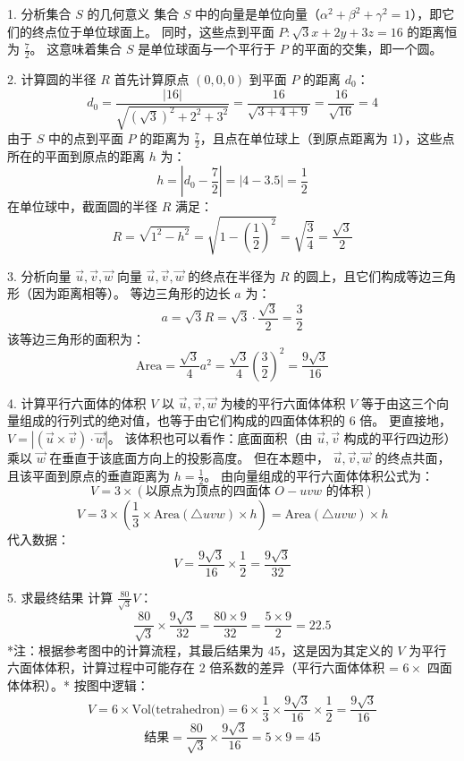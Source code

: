 \begin{questions}
\begin{solution}
 1. 分析集合 $S$ 的几何意义
集合 $S$ 中的向量是单位向量（$\alpha^2 + \beta^2 + \gamma^2 = 1$），即它们的终点位于单位球面上。
同时，这些点到平面 $P: \sqrt{3}x + 2y + 3z = 16$ 的距离恒为 $\frac{7}{2}$。
这意味着集合 $S$ 是单位球面与一个平行于 $P$ 的平面的交集，即一个圆。

 2. 计算圆的半径 $R$
首先计算原点 $(0,0,0)$ 到平面 $P$ 的距离 $d_0$：
\[ d_0 = \frac{|16|}{\sqrt{(\sqrt{3})^2 + 2^2 + 3^2}} = \frac{16}{\sqrt{3+4+9}} = \frac{16}{\sqrt{16}} = 4 \]
由于 $S$ 中的点到平面 $P$ 的距离为 $\frac{7}{2}$，且点在单位球上（到原点距离为 1），这些点所在的平面到原点的距离 $h$ 为：
\[ h = |d_0 - \frac{7}{2}| = |4 - 3.5| = \frac{1}{2} \]
在单位球中，截面圆的半径 $R$ 满足：
\[ R = \sqrt{1^2 - h^2} = \sqrt{1 - (\frac{1}{2})^2} = \sqrt{\frac{3}{4}} = \frac{\sqrt{3}}{2} \]

3. 分析向量 $\vec{u}, \vec{v}, \vec{w}$
向量 $\vec{u}, \vec{v}, \vec{w}$ 的终点在半径为 $R$ 的圆上，且它们构成等边三角形（因为距离相等）。
等边三角形的边长 $a$ 为：
\[ a = \sqrt{3}R = \sqrt{3} \cdot \frac{\sqrt{3}}{2} = \frac{3}{2} \]
该等边三角形的面积为：
\[ \text{Area} = \frac{\sqrt{3}}{4} a^2 = \frac{\sqrt{3}}{4} \left(\frac{3}{2}\right)^2 = \frac{9\sqrt{3}}{16} \]

4. 计算平行六面体的体积 $V$
以 $\vec{u}, \vec{v}, \vec{w}$ 为棱的平行六面体体积 $V$ 等于由这三个向量组成的行列式的绝对值，也等于由它们构成的四面体体积的 6 倍。
更直接地， $V = |(\vec{u} \times \vec{v}) \cdot \vec{w}|$。
该体积也可以看作：底面面积（由 $\vec{u}, \vec{v}$ 构成的平行四边形）乘以 $\vec{w}$ 在垂直于该底面方向上的投影高度。
但在本题中， $\vec{u}, \vec{v}, \vec{w}$ 的终点共面，且该平面到原点的垂直距离为 $h = \frac{1}{2}$。
由向量组成的平行六面体体积公式为：
\[ V = 3 \times (\text{以原点为顶点的四面体 } O-uvw \text{ 的体积}) \]
\[ V = 3 \times \left( \frac{1}{3} \times \text{Area}(\triangle uvw) \times h \right) = \text{Area}(\triangle uvw) \times h \]
代入数据：
\[ V = \frac{9\sqrt{3}}{16} \times \frac{1}{2} = \frac{9\sqrt{3}}{32} \]

 5. 求最终结果
计算 $\frac{80}{\sqrt{3}}V$：
\[ \frac{80}{\sqrt{3}} \times \frac{9\sqrt{3}}{32} = \frac{80 \times 9}{32} = \frac{5 \times 9}{2} = 22.5 \]
*注：根据参考图中的计算流程，其最后结果为 45，这是因为其定义的 $V$ 为平行六面体体积，计算过程中可能存在 2 倍系数的差异（平行六面体体积 = $6 \times$ 四面体体积）。*
按图中逻辑：
\[ V = 6 \times \text{Vol(tetrahedron)} = 6 \times \frac{1}{3} \times \frac{9\sqrt{3}}{16} \times \frac{1}{2} = \frac{9\sqrt{3}}{16} \]
\[ \text{结果} = \frac{80}{\sqrt{3}} \times \frac{9\sqrt{3}}{16} = 5 \times 9 = 45 \]
\end{solution}


\end{questions}
